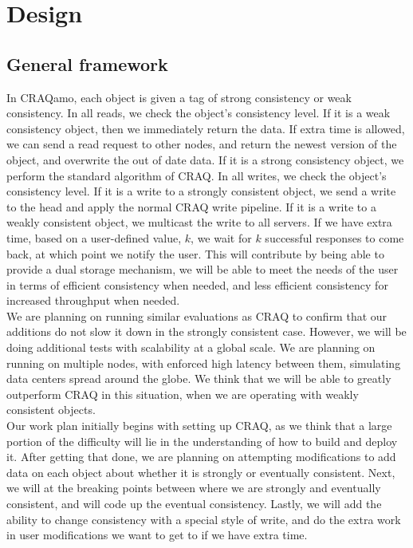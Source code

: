 \section{Design}
\label{sec:design}

\subsection{General framework}
In CRAQamo, each object is given a tag of strong consistency or weak consistency.  In all reads, we check the object's consistency level.  If it is a weak consistency object, then we immediately return the data.  If extra time is allowed, we can send a read request to other nodes, and return the newest version of the object, and overwrite the out of date data.  If it is a strong consistency object, we perform the standard algorithm of CRAQ.  In all writes, we check the object's consistency level.  If it is a write to a strongly consistent object, we send a write to the head and apply the normal CRAQ write pipeline. If it is a write to a weakly consistent object, we multicast the write to all servers.  If we have extra time, based on a user-defined value, $k$, we wait for $k$ successful responses to come back, at which point we notify the user. This will contribute by being able to provide a dual storage mechanism, we will be able to meet the needs of the user in terms of efficient consistency when needed, and less efficient consistency for increased throughput when needed.\\

We are planning on running similar evaluations as CRAQ to confirm that our additions do not slow it down in the strongly consistent case.  However, we will be doing additional tests with scalability at a global scale.  We are planning on running on multiple nodes, with enforced high latency between them, simulating data centers spread around the globe.  We think that we will be able to greatly outperform CRAQ in this situation, when we are operating with weakly consistent objects.\\

Our work plan initially begins with setting up CRAQ, as we think that a large portion of the difficulty will lie in the understanding of how to build and deploy it.  After getting that done, we are planning on attempting modifications to add data on each object about whether it is strongly or eventually consistent.  Next, we will at the breaking points between where we are strongly and eventually consistent, and will code up the eventual consistency.  Lastly, we will add the ability to change consistency with a special style of write, and do the extra work in user modifications we want to get to if we have extra time.\\

